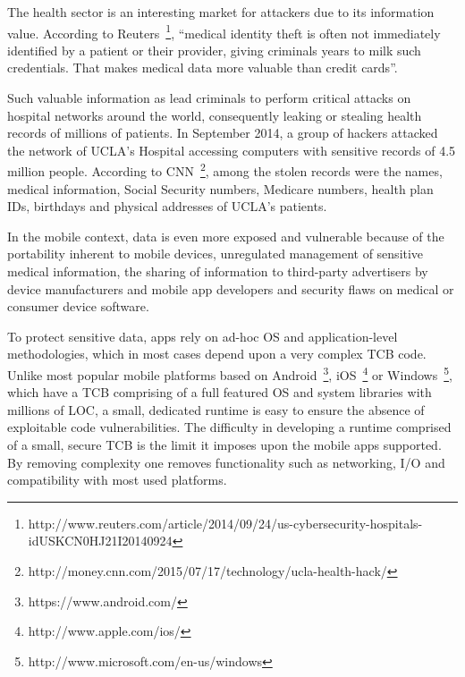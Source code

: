 The health sector is an interesting market for attackers due to its information value. According to Reuters~\footnote{http://www.reuters.com/article/2014/09/24/us-cybersecurity-hospitals-idUSKCN0HJ21I20140924}, ``medical identity theft is often not immediately identified by a patient or their provider, giving criminals years to milk such credentials. That makes medical data more valuable than credit cards''.


Such valuable information as lead criminals to perform critical attacks on hospital networks around the world, consequently leaking or stealing health records of millions of patients. In September 2014, a group of hackers attacked the network of \ac{UCLA}'s Hospital accessing computers with sensitive records of 4.5 million people. According to \ac{CNN}~\footnote{http://money.cnn.com/2015/07/17/technology/ucla-health-hack/}, among the stolen records were the names, medical information, Social Security numbers, Medicare numbers, health plan IDs, birthdays and physical addresses of \ac{UCLA}'s patients.

In the mobile context, data is even more exposed and vulnerable because of the portability inherent to mobile devices, unregulated management of sensitive medical information, the sharing of information to third-party advertisers by device manufacturers and mobile app developers and security flaws on medical or consumer device software.

To protect sensitive data, \ac{apps} rely on ad-hoc \ac{OS} and application-level methodologies, which in most cases depend upon a very complex \ac{TCB} code. Unlike most popular mobile platforms based on Android~\footnote{https://www.android.com/}, iOS~\footnote{http://www.apple.com/ios/} or Windows~\footnote{http://www.microsoft.com/en-us/windows}, which have a \ac{TCB} comprising of a full featured \ac{OS} and system libraries with millions of \ac{LOC}, a small, dedicated runtime is easy to ensure the absence of exploitable code vulnerabilities. The difficulty in developing a runtime comprised of a small, secure \ac{TCB} is the limit it imposes upon the mobile \ac{apps} supported. By removing complexity one removes functionality such as networking, I/O and compatibility with most used platforms.

